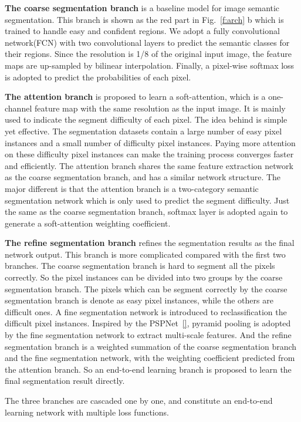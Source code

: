 \documentclass[10.5pt,compsoc]{TsT}
\theoremstyle{mystyle}
\begin{document}
{\textbf{The coarse segmentation branch} is a baseline model for image semantic segmentation.
This branch is shown as the red part in Fig.~\ref{f:arch} b which is trained to handle easy and confident regions. We adopt a fully convolutional network(FCN) with two convolutional layers to predict the semantic classes for their regions. 
Since the resolution is 1/8 of the original input image, the feature maps are up-sampled by bilinear interpolation.
Finally, a pixel-wise softmax loss is adopted to predict the probabilities of each pixel.


\textbf{The attention branch} is proposed to learn a soft-attention, which is a one-channel feature map with the same resolution as the input image. 
It is mainly used to indicate the segment difficulty of each pixel.
The idea behind is simple yet effective. 
The segmentation datasets contain a large number of easy pixel instances and a small number of difficulty pixel instances.
Paying more attention on these difficulty pixel instances can make the training process converges faster and efficiently.
The attention branch shares the same feature extraction network as the coarse segmentation branch, and has a similar network structure.
The major different is that the attention branch is a two-category semantic segmentation network which is only used to predict the segment difficulty.
Just the same as the coarse segmentation branch, softmax layer is adopted again to generate a soft-attention weighting coefficient.


\textbf{The refine segmentation branch} refines the segmentation results as the final network output.
This branch is more complicated compared with the first two branches.
The coarse segmentation branch is hard to segment all the pixels correctly.
So the pixel instances can be divided into two groups by the coarse segmentation branch.
The pixels which can be segment correctly by the coarse segmentation branch is denote as easy pixel instances, while the others are difficult ones.
A fine segmentation network is introduced to reclassification the difficult pixel instances.
Inspired by the PSPNet~\ref{}, pyramid pooling is adopted by the fine segmentation network to extract multi-scale features.
And the refine segmentation branch is a weighted summation of the coarse segmentation branch and the fine segmentation network, with the weighting coefficient predicted from the attention branch.
So an end-to-end learning branch is proposed to learn the final segmentation result directly.

The three branches are cascaded one by one, and constitute an end-to-end learning network with multiple loss functions.

}
\end{document}
